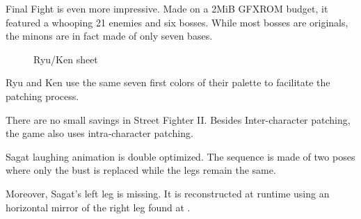 \begin{minipage}[t]{0.19\linewidth}
\end{minipage}%
\hfill%
\begin{minipage}[t]{0.19\linewidth}
\end{minipage}
\hfill%
\begin{minipage}[t]{0.19\linewidth}
\end{minipage}%
\hfill%
\begin{minipage}[t]{0.19\linewidth}
\end{minipage}
\hfill%
\begin{minipage}[t]{0.19\linewidth}
\end{minipage}

Final Fight is even more impressive. Made on a 2MiB GFXROM budget, it featured a whooping 21 enemies and six bosses. While most bosses are originals, the minons are in fact made of only seven bases.

\begin{minipage}[t]{0.29\linewidth}
\end{minipage}
\hfill%
\begin{minipage}[t]{0.29\linewidth}
\end{minipage}
\hfill%
\begin{minipage}[t]{0.29\linewidth}
\end{minipage}

 \begin{figure}[H]
\caption*{Ryu/Ken sheet}
\end{figure}

Ryu and Ken use the same seven first colors of their palette to facilitate the patching process. 








There are no small savings in Street Fighter II. Besides Inter-character patching, the game also uses intra-character patching.  

Sagat laughing animation is double optimized. The sequence is made of two poses where only the bust is replaced while the legs remain the same.

Moreover, Sagat's left leg is missing. It is reconstructed at runtime using an horizontal mirror of the right leg found at .


